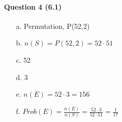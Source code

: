 \documentclass[a4paper,12pt]{book}
\begin{document}
        \paragraph{Question 4 (6.1)}
            \begin{enumerate}
                \item[a.] Permutation, P(52,2)
                \item[b.] $n(S) = P(52,2) = 52 \cdot 51$
                \item[c.] 52
                \item[d.] 3
                \item[e.] $n(E) = 52 \cdot 3 = 156$
                \item[f.] $Prob(E) = \frac{n(E)}{n(S)} = \frac{52 \cdot 3}{52 \cdot 51} = \frac{1}{17}$
            \end{enumerate}

        \newpage


            
\end{document}
